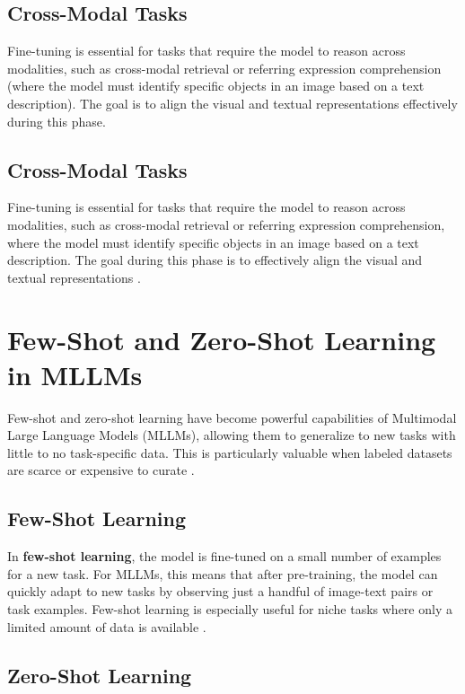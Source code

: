 \subsection{Cross-Modal Tasks}

Fine-tuning is essential for tasks that require the model to reason across modalities, such as cross-modal retrieval or referring expression comprehension (where the model must identify specific objects in an image based on a text description). The goal is to align the visual and textual representations effectively during this phase.

\subsection{Cross-Modal Tasks}

Fine-tuning is essential for tasks that require the model to reason across modalities, such as cross-modal retrieval or referring expression comprehension, where the model must identify specific objects in an image based on a text description. The goal during this phase is to effectively align the visual and textual representations \cite{CrossModalTasks2024}.

\section{Few-Shot and Zero-Shot Learning in MLLMs}

Few-shot and zero-shot learning have become powerful capabilities of Multimodal Large Language Models (MLLMs), allowing them to generalize to new tasks with little to no task-specific data. This is particularly valuable when labeled datasets are scarce or expensive to curate \cite{FewShotZeroShotLearning2024}.

\subsection{Few-Shot Learning}

In \textbf{few-shot learning}, the model is fine-tuned on a small number of examples for a new task. For MLLMs, this means that after pre-training, the model can quickly adapt to new tasks by observing just a handful of image-text pairs or task examples. Few-shot learning is especially useful for niche tasks where only a limited amount of data is available \cite{FewShotLearning2024}.

\subsection{Zero-Shot Learning}

